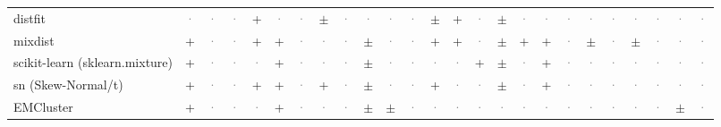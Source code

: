 \documentclass[10pt,a4paper]{article}
\begin{document}
\begin{landscape}
{\begin{longtable}{@{}l *{24}{c}@{}}
distfit & \textcolor{gray}{·} & \textcolor{gray}{·} & \textcolor{gray}{·} & \cellcolor{yes!35}+ & \textcolor{gray}{·} & \textcolor{gray}{·} & \cellcolor{part!45}$\pm$ & \textcolor{gray}{·} & \textcolor{gray}{·} & \textcolor{gray}{·} & \textcolor{gray}{·} & \cellcolor{part!45}$\pm$ & \cellcolor{yes!35}+ & \textcolor{gray}{·} & \cellcolor{part!45}$\pm$ & \textcolor{gray}{·} & \textcolor{gray}{·} & \textcolor{gray}{·} & \textcolor{gray}{·} & \textcolor{gray}{·} & \textcolor{gray}{·} & \textcolor{gray}{·} & \textcolor{gray}{·} & \textcolor{gray}{·} \\
mixdist & \cellcolor{yes!35}+ & \textcolor{gray}{·} & \textcolor{gray}{·} & \cellcolor{yes!35}+ & \cellcolor{yes!35}+ & \textcolor{gray}{·} & \textcolor{gray}{·} & \textcolor{gray}{·} & \cellcolor{part!45}$\pm$ & \textcolor{gray}{·} & \textcolor{gray}{·} & \cellcolor{yes!35}+ & \cellcolor{yes!35}+ & \textcolor{gray}{·} & \cellcolor{part!45}$\pm$ & \cellcolor{yes!35}+ & \cellcolor{yes!35}+ & \textcolor{gray}{·} & \cellcolor{part!45}$\pm$ & \textcolor{gray}{·} & \cellcolor{part!45}$\pm$ & \textcolor{gray}{·} & \textcolor{gray}{·} & \textcolor{gray}{·} \\
scikit-learn (sklearn.mixture) & \cellcolor{yes!35}+ & \textcolor{gray}{·} & \textcolor{gray}{·} & \textcolor{gray}{·} & \cellcolor{yes!35}+ & \textcolor{gray}{·} & \textcolor{gray}{·} & \textcolor{gray}{·} & \cellcolor{part!45}$\pm$ & \textcolor{gray}{·} & \textcolor{gray}{·} & \textcolor{gray}{·} & \textcolor{gray}{·} & \cellcolor{yes!35}+ & \cellcolor{part!45}$\pm$ & \textcolor{gray}{·} & \cellcolor{yes!35}+ & \textcolor{gray}{·} & \textcolor{gray}{·} & \textcolor{gray}{·} & \textcolor{gray}{·} & \textcolor{gray}{·} & \textcolor{gray}{·} & \textcolor{gray}{·} \\
sn (Skew-Normal/t) & \cellcolor{yes!35}+ & \textcolor{gray}{·} & \textcolor{gray}{·} & \cellcolor{yes!35}+ & \cellcolor{yes!35}+ & \textcolor{gray}{·} & \cellcolor{yes!35}+ & \textcolor{gray}{·} & \cellcolor{part!45}$\pm$ & \textcolor{gray}{·} & \textcolor{gray}{·} & \cellcolor{yes!35}+ & \textcolor{gray}{·} & \textcolor{gray}{·} & \cellcolor{part!45}$\pm$ & \textcolor{gray}{·} & \cellcolor{yes!35}+ & \textcolor{gray}{·} & \textcolor{gray}{·} & \textcolor{gray}{·} & \textcolor{gray}{·} & \textcolor{gray}{·} & \textcolor{gray}{·} & \textcolor{gray}{·} \\
EMCluster & \cellcolor{yes!35}+ & \textcolor{gray}{·} & \textcolor{gray}{·} & \textcolor{gray}{·} & \cellcolor{yes!35}+ & \textcolor{gray}{·} & \textcolor{gray}{·} & \textcolor{gray}{·} & \cellcolor{part!45}$\pm$ & \cellcolor{part!45}$\pm$ & \textcolor{gray}{·} & \textcolor{gray}{·} & \textcolor{gray}{·} & \textcolor{gray}{·} & \textcolor{gray}{·} & \textcolor{gray}{·} & \textcolor{gray}{·} & \textcolor{gray}{·} & \textcolor{gray}{·} & \textcolor{gray}{·} & \textcolor{gray}{·} & \textcolor{gray}{·} & \cellcolor{part!45}$\pm$ & \textcolor{gray}{·} \\

\end{longtable}}
\end{landscape}
\end{document}

